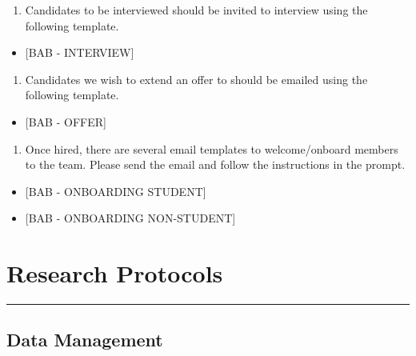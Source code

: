 \documentclass[]{book}
\providecommand{\tightlist}{%
  \setlength{\itemsep}{0pt}\setlength{\parskip}{0pt}}
\begin{document}
\begin{enumerate}
\def\labelenumi{\arabic{enumi}.}
\setcounter{enumi}{1}
\tightlist
\item
  Candidates to be interviewed should be invited to interview using the following template.
\end{enumerate}

\begin{itemize}
\tightlist
\item
  {[}BAB - INTERVIEW{]}
\end{itemize}

\begin{enumerate}
\def\labelenumi{\arabic{enumi}.}
\setcounter{enumi}{2}
\tightlist
\item
  Candidates we wish to extend an offer to should be emailed using the following template.
\end{enumerate}

\begin{itemize}
\tightlist
\item
  {[}BAB - OFFER{]}
\end{itemize}

\begin{enumerate}
\def\labelenumi{\arabic{enumi}.}
\setcounter{enumi}{3}
\tightlist
\item
  Once hired, there are several email templates to welcome/onboard members to the team. Please send the email and follow the instructions in the prompt.
\end{enumerate}

\begin{itemize}
\tightlist
\item
  {[}BAB - ONBOARDING STUDENT{]}
\item
  {[}BAB - ONBOARDING NON-STUDENT{]}
\end{itemize}

\hypertarget{research-protocols}{%
\chapter{Research Protocols}\label{research-protocols}}

\begin{center}\rule{0.5\linewidth}{0.5pt}\end{center}

\hypertarget{data-management}{%
\section{Data Management}\label{data-management}}
\end{document}
